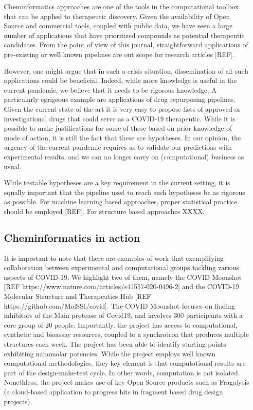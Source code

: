 \documentclass{bmcart}
\begin{document}
Cheminformatics approaches are one of the tools in the computational
toolbox that can be applied to therapeutic discovery. Given the
availability of Open Source and commercial tools, coupled with public
data, we have seen a large number of applications that have
prioritized compounds as potential therapeutic candidates. From the
point of view of this journal, straightforward applications of
pre-existing or well known pipelines are out scope for research
articles [REF].

However, one might argue that in such a crisis situation,
dissemination of all such applications could be beneficial. Indeed,
while more knowledge is useful in
the current pandemic, we believe that it needs to be rigorous
knowledge. A particularly egrigeous example are applications of drug
repurposing pipelines. Given the current state of the art it is very
easy to propose lists of approved or investigational drugs that could
serve as a COVID-19 therapeutic. While it is possible to make
justifications for some of these based on prior knowledge of mode of
action, it is still the fact that these are hypotheses. In our opinion,
the urgency of the current pandemic requires us to validate our
predictions with experimental results, and we can no longer carry on
(computational) business as usual.

While testable hypotheses are a key requirement in the current
setting, it is equally important that the pipeline used to reach such
hypotheses be as rigorous as possible. For machine learning based
approaches, proper statistical practice should be employed [REF]. For
structure based approaches XXXX.

\subsection*{Cheminformatics in action}
\label{sec:chem-acti}

It is important to note that there are examples of work that
exemplifying collaboration between experimental and computational groups
tackling various aspects of COVID-19. We highlight two of them, namely
the COVID Moonshot [REF
https://www.nature.com/articles/s41557-020-0496-2] and the COVID-19
Molecular Structure and Therapeutics Hub [REF
https://github.com/MolSSI/covid]. The COVID Moonshot focuses on
finding inhibitors of the Main protease of Covid19, and involves 300
participants with a core group of 20 people. Importantly, the project
has access to computational, synthetic and bioassay resources, coupled
to a synchrotron that produces multiple structures each week. The
project has been able to identify starting points exhibiting
nanomolar potencies. While the project employs well known
computational methodologies, they key element is that
computational results are part of the design-make-test
cycle. In other words, computation is not isolated. Nonethless, the
project makes use of key Open Source products such as Fragalysis (a
cloud-based application to progress hits in fragment based drug design
projects).
\end{document}
